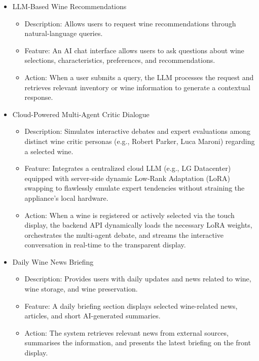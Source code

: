 \documentclass[conference]{IEEEtran}
\begin{document}
\begin{itemize}
    \item LLM-Based Wine Recommendations
    \begin{itemize}
        \item Description: Allows users to request wine recommendations through natural-language queries.
        \item Feature: An AI chat interface allows users to ask questions about wine selections, characteristics, preferences, and recommendations.
        \item Action: When a user submits a query, the LLM processes the request and retrieves relevant inventory or wine information to generate a contextual response.
    \end{itemize}

    \item Cloud-Powered Multi-Agent Critic Dialogue
    \begin{itemize}
        \item Description: Simulates interactive debates and expert evaluations among distinct wine critic personas (e.g., Robert Parker, Luca Maroni) regarding a selected wine.
        \item Feature: Integrates a centralized cloud LLM (e.g., LG Datacenter) equipped with server-side dynamic Low-Rank Adaptation (LoRA) swapping to flawlessly emulate expert tendencies without straining the appliance's local hardware.
        \item Action: When a wine is registered or actively selected via the touch display, the backend API dynamically loads the necessary LoRA weights, orchestrates the multi-agent debate, and streams the interactive conversation in real-time to the transparent display.
    \end{itemize}

    \item Daily Wine News Briefing
    \begin{itemize}
        \item Description: Provides users with daily updates and news related to wine, wine storage, and wine preservation.
        \item Feature: A daily briefing section displays selected wine-related news, articles, and short AI-generated summaries.
        \item Action: The system retrieves relevant news from external sources, summarises the information, and presents the latest briefing on the front display.
    \end{itemize}
\end{itemize}
\end{document}
